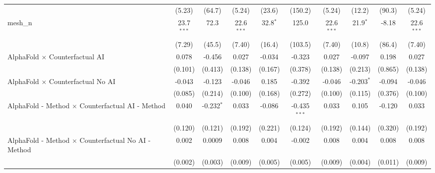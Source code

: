 \begin{tabular}{lccccccccc}
                                                               & (5.23)         & (64.7)         & (5.24)        & (23.6)         & (150.2)        & (5.24)        & (12.2)         & (90.3)         & (5.24)\\   
   mesh\_n                                                     & 23.7$^{***}$   & 72.3           & 22.6$^{***}$  & 32.8$^{*}$     & 125.0          & 22.6$^{***}$  & 21.9$^{*}$     & -8.18          & 22.6$^{***}$\\   
                                                               & (7.29)         & (45.5)         & (7.40)        & (16.4)         & (103.5)        & (7.40)        & (10.8)         & (86.4)         & (7.40)\\   
   AlphaFold $\times$ Counterfactual AI                        & 0.078          & -0.456         & 0.027         & -0.034         & -0.323         & 0.027         & -0.097         & 0.198          & 0.027\\   
                                                               & (0.101)        & (0.413)        & (0.138)       & (0.167)        & (0.378)        & (0.138)       & (0.213)        & (0.865)        & (0.138)\\   
   AlphaFold $\times$ Counterfactual No AI                     & -0.043         & -0.123         & -0.046        & 0.185          & -0.392         & -0.046        & -0.203$^{*}$   & -0.094         & -0.046\\   
                                                               & (0.085)        & (0.214)        & (0.100)       & (0.168)        & (0.272)        & (0.100)       & (0.115)        & (0.376)        & (0.100)\\   
   AlphaFold - Method $\times$ Counterfactual AI - Method      & 0.040          & -0.232$^{*}$   & 0.033         & -0.086         & -0.435$^{***}$ & 0.033         & 0.105          & -0.120         & 0.033\\   
                                                               & (0.120)        & (0.121)        & (0.192)       & (0.221)        & (0.124)        & (0.192)       & (0.144)        & (0.320)        & (0.192)\\   
   AlphaFold - Method $\times$ Counterfactual No AI - Method   & 0.002          & 0.0009         & 0.008         & 0.004          & -0.002         & 0.008         & 0.004          & 0.008          & 0.008\\   
                                                               & (0.002)        & (0.003)        & (0.009)       & (0.005)        & (0.005)        & (0.009)       & (0.004)        & (0.011)        & (0.009)\\   

\end{tabular}
